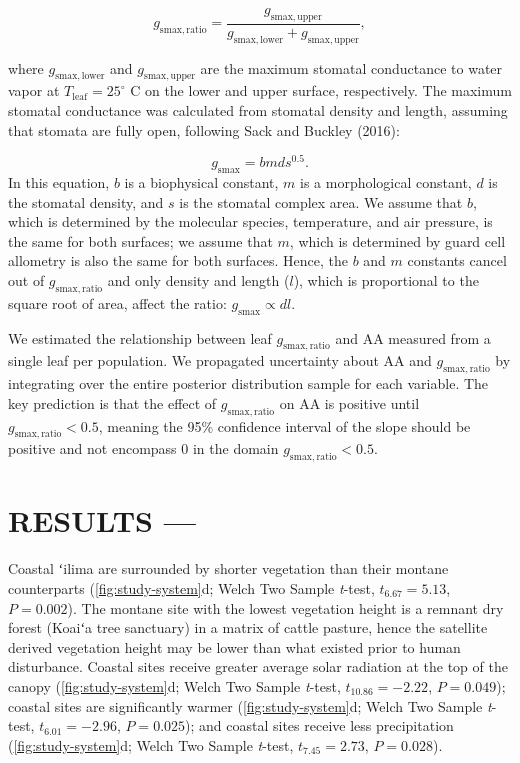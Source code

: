 \documentclass[
  letterpaper,
  DIV=11,
  numbers=noendperiod]{scrartcl}
\begin{document}
\[g_\mathrm{smax,ratio} = \frac{g_\mathrm{smax,upper}}{g_\mathrm{smax,lower} + g_\mathrm{smax,upper}},\]

where \(g_\mathrm{smax,lower}\) and \(g_\mathrm{smax,upper}\) are the
maximum stomatal conductance to water vapor at
\(T_\mathrm{leaf} = 25 ^ \circ\) C on the lower and upper surface,
respectively. The maximum stomatal conductance was calculated from
stomatal density and length, assuming that stomata are fully open,
following Sack and Buckley (2016):

\[g_\mathrm{smax} = bmds^{0.5}.\] In this equation, \(b\) is a
biophysical constant, \(m\) is a morphological constant, \(d\) is the
stomatal density, and \(s\) is the stomatal complex area. We assume that
\(b\), which is determined by the molecular species, temperature, and
air pressure, is the same for both surfaces; we assume that \(m\), which
is determined by guard cell allometry is also the same for both
surfaces. Hence, the \(b\) and \(m\) constants cancel out of
\(g_\mathrm{smax,ratio}\) and only density and length (\(l\)), which is
proportional to the square root of area, affect the ratio:
\(g_\mathrm{smax} \propto dl\).

We estimated the relationship between leaf \(g_\mathrm{smax,ratio}\) and
\(\mathrm{AA}\) measured from a single leaf per population. We
propagated uncertainty about \(\mathrm{AA}\) and
\(g_\mathrm{smax,ratio}\) by integrating over the entire posterior
distribution sample for each variable. The key prediction is that the
effect of \(g_\mathrm{smax,ratio}\) on \(\mathrm{AA}\) is positive until
\(g_\mathrm{smax,ratio} < 0.5\), meaning the 95\% confidence interval of
the slope should be positive and not encompass 0 in the domain
\(g_\mathrm{smax,ratio} < 0.5\).

\hypertarget{results}{%
\section{RESULTS ---}\label{results}}

Coastal ʻilima are surrounded by shorter vegetation than their montane
counterparts (\autoref{fig:study-system}d; Welch Two Sample
\emph{t}-test, \(t_{6.67} = 5.13\), \(P = 0.002\)). The montane site
with the lowest vegetation height is a remnant dry forest (Koaiʻa tree
sanctuary) in a matrix of cattle pasture, hence the satellite derived
vegetation height may be lower than what existed prior to human
disturbance. Coastal sites receive greater average solar radiation at
the top of the canopy (\autoref{fig:study-system}d; Welch Two Sample
\emph{t}-test, \(t_{10.86} = -2.22\), \(P = 0.049\)); coastal sites are
significantly warmer (\autoref{fig:study-system}d; Welch Two Sample
\emph{t}-test, \(t_{6.01} = -2.96\), \(P = 0.025\)); and coastal sites
receive less precipitation (\autoref{fig:study-system}d; Welch Two
Sample \emph{t}-test, \(t_{7.45} = 2.73\), \(P = 0.028\)).
\end{document}
